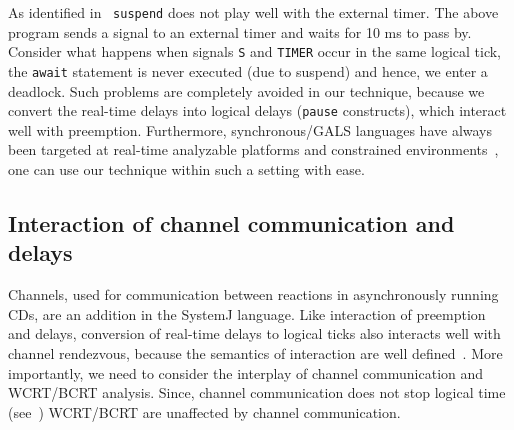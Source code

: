 As identified in~\cite{Bourke2009a} \texttt{suspend} does not play well
with the external timer. The above program sends a signal to an external
timer and waits for 10 ms to pass by. Consider what happens when signals
\texttt{S} and \texttt{TIMER} occur in the same logical tick, the
\texttt{await} statement is never executed (due to suspend) and hence,
we enter a deadlock. Such problems are completely avoided in our
technique, because we convert the real-time delays into logical delays
(\texttt{pause} constructs), which interact well with preemption.
Furthermore, synchronous/GALS languages have always been targeted at
real-time analyzable platforms and constrained
environments~\cite{DBLP:journals/pieee/SifakisTY03,boldt07}, one can use
our technique within such a setting with ease.


\subsection{Interaction of channel communication and delays}
\label{sec:inter-chann-comm}

Channels, used for communication between reactions in asynchronously
running CDs, are an addition in the SystemJ language. Like interaction
of preemption and delays, conversion of real-time delays to logical
ticks also interacts well with channel rendezvous, because the semantics
of interaction are well defined~\cite{amal10}. More importantly, we need
to consider the interplay of channel communication and WCRT/BCRT
analysis. Since, channel communication does not stop logical time
(see~\cite{amal10}) WCRT/BCRT are unaffected by channel
communication. %





